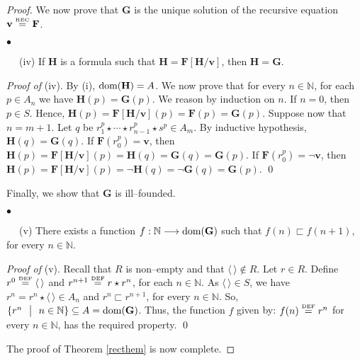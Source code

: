 \documentclass[copyright,creativecommons]{eptcs}
\newcommand{\vv}{\langle}
\newcommand{\ww}{\rangle}
\newcommand{\NN}{\mathbb{N}}
\newcommand{\eqdef}{\stackrel{\text{\tiny \textnormal{DEF}}}{=}}
\newcommand{\eqrec}{\stackrel{\text{\tiny \textnormal{REC}}}{=}}
\newcommand{\st}{ \ \ \big{|} \ \ }
\newcommand{\roo}{\vv \, \ww}
\newcommand{\bF}{\mathbf{F}}
\newcommand{\bG}{\mathbf{G}}
\newcommand{\bH}{\mathbf{H}}
\newcommand{\bbv}{\mathbf{v}}
\newcommand{\dom}{\ensuremath{\textnormal{dom}}}
\newcommand{\arr}{\longrightarrow}
\theoremstyle{definition}
\newcommand{\squishlist}{
 \begin{list}{$\bullet$}
  { \setlength{\itemsep}{0pt}
     \setlength{\parsep}{3pt}
     \setlength{\topsep}{3pt}
     \setlength{\partopsep}{0pt}
     \setlength{\leftmargin}{1em}
     \setlength{\labelwidth}{1.5em}
     \setlength{\labelsep}{0.5em} } }
\newcommand{\squishend}{
  \end{list}  }
\begin{document}
\begin{proof}
 We now prove that $\bG$ is the unique solution of the recursive equation  $\bbv \eqrec \bF$.


\squishlist
\item[$\phantom{ab}$ (iv)] If  $\bH$ is a formula such that $\bH = \bF[\bH/\bbv]$, then $\bH = \bG$.
 \squishend
 \noindent\emph{Proof of} (iv).
By (i), $\dom(\bH) = A$.  We now prove that for every $n \in \NN$, for each $p \in A_n$ we have
 $\bH(p) = \bG(p)$.
We reason by induction on $n$.
If $ n = 0$, then $ p\in S$. Hence,
$\bH(p) = \bF[\bH/\bbv](p) = \bF(p) = \bG(p)$.
Suppose now that $ n = m+1$.
Let  $q $ be $r^p_{1} \star \cdots \star r^p_{n-1}\star s^p \in A_m$. By inductive hypothesis,  $\bH(q) = \bG(q)$.
  If  $\bF(r^p_0) = \bbv$, then $\bH(p) = \bF[\bH/\bbv](p)
= \bH(q) = \bG(q) = \bG(p)$.
 If  $\bF(r^p_0) = \neg \bbv$, then $\bH(p) = \bF[\bH/\bbv](p)
= \neg \bH(q) = \neg \bG(q) = \bG(p)$.
 \qed

Finally, we show that $\bG$ is ill--founded.



\squishlist
\item[$\phantom{ab}$ (v)] There exists a function $f : \NN \arr \dom(\bG)$ such that
$f(n) \sqsubset f(n+1)$, for every $n \in \NN$.
 \squishend



 \noindent\emph{Proof of} (v).
Recall that  $R$ is non--empty and that $\roo \notin R$. Let $r \in R$.
Define
\ $r^0 \eqdef \roo$  and $r^{n+1} \eqdef r \star r^n$, for each $n \in \NN$.
As $\roo \in S$,  we have  $r^n = r^n \star \roo \in A_n$
and $r^n \sqsubset r^{n+1}$, for every $n \in \NN$.
So, $\{r^n \st n \in \NN\} \subseteq A = \dom(\bG)$.
Thus, the function $f$ given by: $f(n) \eqdef r^n$ for every $n \in \NN$,
has the required property. \qed



The proof of Theorem \ref{recthem} is now complete.
\end{proof}
\end{document}
